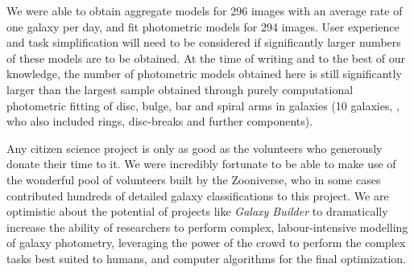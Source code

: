 \documentclass[../main.tex]{subfiles}
\begin{document}
We were able to obtain aggregate models for 296 images with an average rate of one galaxy per day, and fit photometric models for 294 images. User experience and task simplification will need to be considered if significantly larger numbers of these models are to be obtained. At the time of writing and to the best of our knowledge, the number of photometric models obtained here is still significantly larger than the largest sample obtained through purely computational photometric fitting of disc, bulge, bar and spiral arms in galaxies (10 galaxies, \citealt{Gao2017:1709.00746v1}, who also included rings, disc-breaks and further components).

Any citizen science project is only as good as the volunteers who generously donate their time to it. We were incredibly fortunate to be able to make use of the wonderful pool of volunteers built by the Zooniverse, who in some cases contributed hundreds of detailed galaxy classifications to this project. We are optimistic about the potential of projects like \textit{Galaxy Builder} to dramatically increase the ability of researchers to perform complex, labour-intensive modelling of galaxy photometry, leveraging the power of the crowd to perform the complex tasks best suited to humans, and computer algorithms for the final optimization.
\end{document}
